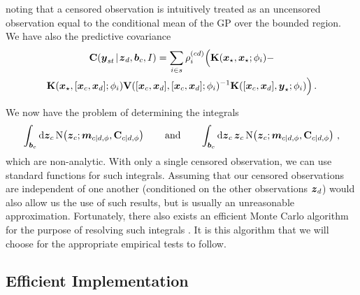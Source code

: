 \documentclass{acmtrans2m}
\begin{document}
noting that a censored observation is intuitively treated as an uncensored observation equal to the conditional mean of the GP over the bounded region. We have also the predictive covariance
\begin{multline*} %
\covsub{\vy}{st}{\vzD,\vect{b}_c,I}=\sum_{i\in s}\rho^{(cd)}_i \Big(\mat{K}(\vxst,\vxst;\phi_i)-\\\mat{K}(\vxst,[\vx_c,\vxD];\phi_i)\mat{V}([\vx_c,\vxD],[\vx_c,\vxD];\phi_i)^{-1}\mat{K}([\vx_c,\vxD],\vyst;\phi_i)\Big)\,.
\end{multline*}

We now have the problem of determining the integrals 
\begin{equation*} %
\int_{\vect{b}_c}\ud\vz_c\,\N{\vz_c}{\vect{m}_{c|d,\phi}}{\mat{C}_{c|d,\phi}} \qquad \text{and} \qquad
\int_{\vect{b}_c}\ud\vz_c\,\vz_c\, \N{\vz_c}{\vect{m}_{c|d,\phi}}{\mat{C}_{c|d,\phi}}\,,
\end{equation*}
which are non-analytic. With only a single censored observation, we can use standard functions for such integrals. Assuming that our censored observations are independent of one another (conditioned on the other observations $\boldsymbol{z}_d$) would also allow us the use of such results, but is usually an unreasonable approximation. Fortunately, there also exists an efficient Monte Carlo algorithm  for the purpose of resolving such integrals \cite{genz1992ncm}. It is this algorithm that we will choose for the appropriate empirical tests to follow.

\subsection{Efficient Implementation}\label{sec_efficient}
\end{document}
